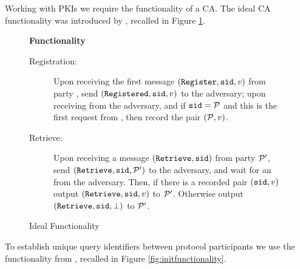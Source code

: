 \noindent
Working with \acp{PKI} we require the functionality of a \ac{CA}.
The ideal \ac{CA} functionality \Fca was introduced by \citet{Canetti04}, recalled in Figure \ref{fig:cafunctionality}.

\begin{figure}[h!]
\begin{mdframed}[innertopmargin=10pt]
\begin{center}
{\bf Functionality \Fca}
\end{center}

\begin{description}
	
	\item[Registration:] Upon receiving the first message $(\mathtt{Register}, \mathtt{sid}, v)$ from party \cP, send $(\mathtt{Registered}, \mathtt{sid}, v)$ to the adversary; upon receiving \ok from the adversary, and if $\mathtt{sid}=\mathcal{P}$ and this is the first request from \cP, then record the pair $(\mathcal{P},v)$.
	
	\item[Retrieve:] Upon receiving a message $(\mathtt{Retrieve}, \mathtt{sid})$ from party $\mathcal{P}'$, send $(\mathtt{Retrieve}, \mathtt{sid}, \mathcal{P}')$ to the adversary, and wait for an \ok from the adversary.
	            Then, if there is a recorded pair $(\mathtt{sid}, v)$ output $(\mathtt{Retrieve}, \mathtt{sid}, v)$ to $\mathcal{P}'$.
	            Otherwise output $(\mathtt{Retrieve}, \mathtt{sid}, \bot)$ to $\mathcal{P}'$.
	
\end{description}
\end{mdframed}
\caption{Ideal Functionality \Fca}
\label{fig:cafunctionality}
\end{figure}

\noindent
To establish unique query identifiers between protocol participants we use the \Finit functionality from \citet{BarakLR04}, recalled in Figure \ref{fig:initfunctionality}.

